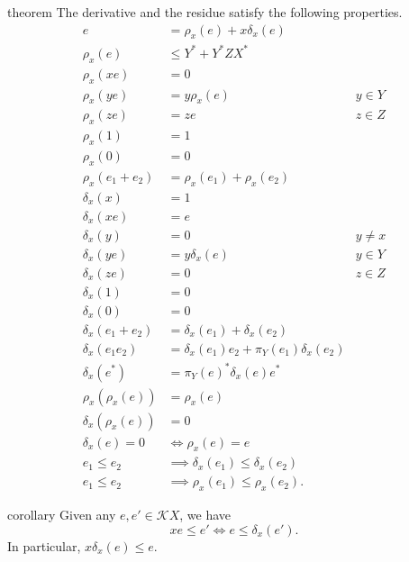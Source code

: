 \documentclass[a4paper,UKenglish,cleveref, autoref, thm-restate]{lipics-v2021}
\begin{document}
\begin{theoremEnd}{theorem}
  \label{thm:derivative-laws}
  The derivative and the residue satisfy the following properties.
  \begin{align*}
    e & =  \rho _x(e) + x \delta _x(e) \\
     \rho _x(e) &  \leq  Y^*+Y^*ZX^* \\
     \rho _x(xe) & = 0 \\
     \rho _x(ye) & = y \rho _x(e) & y  \in  Y \\
     \rho _x(ze) & = ze & z  \in  Z \\
     \rho _x(1) & = 1 \\
     \rho _x(0) & = 0 \\
     \rho _x(e_{1} + e_{2}) & =  \rho _x(e_{1}) +  \rho _x(e_{2}) \\
     \delta _x(x) & = 1 \\
     \delta _x(xe) & = e \\
     \delta _x(y) & = 0 & y  \neq  x \\
     \delta _x(ye) & = y \delta _x(e) & y  \in  Y \\
     \delta _x(ze) & = 0 & z  \in  Z \\
     \delta _x(1) & = 0 \\
     \delta _x(0) & = 0 \\
     \delta _x(e_{1}+e_{2}) & =  \delta _x(e_{1})+ \delta _x(e_{2}) \\
     \delta _x(e_{1}e_{2}) & =  \delta _x(e_{1})e_{2} +  \pi _Y(e_{1}) \delta _x(e_{2}) \\
     \delta _x(e^*) & =  \pi _Y(e)^* \delta _x(e)e^* \\
     \rho _x( \rho _x(e)) & =  \rho _x(e) \\
     \delta _x( \rho _x(e)) & = 0 \\
     \delta _x(e) = 0 &  \iff   \rho _x(e) = e \\
    e_{1}  \leq  e_{2} &  \implies   \delta _{x}(e_{1})  \leq   \delta _{x}(e_{2}) \\
    e_{1}  \leq  e_{2} &  \implies   \rho _{x}(e_{1})  \leq   \rho _{x}(e_{2}).
  \end{align*}
\end{theoremEnd}

\begin{theoremEnd}{corollary}
  \label{cor:derivative-adjunction}
  Given any $e,e'  \in  \mathcal{K}X$, we have
  \[ xe  \leq  e'  \iff  e  \leq   \delta _x(e'). \] In particular, $x \delta _x(e)  \leq  e$.
\end{theoremEnd}
\end{document}

